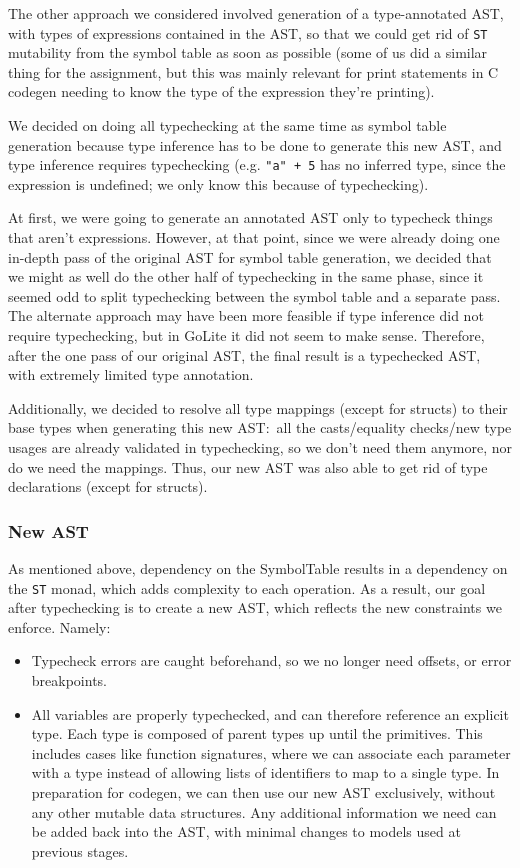 \documentclass[11pt]{article}
\begin{document}
The other approach we considered involved generation of a
type-annotated AST, with types of expressions contained in the AST, so
that we could get rid of \texttt{ST} mutability from the symbol table
as soon as possible (some of us did a similar thing for the
assignment, but this was mainly relevant for print statements in C
codegen needing to know the type of the expression they're printing).

We decided on doing all typechecking at the same time as symbol table
generation because type inference has to be done to generate this new
AST, and type inference requires typechecking (e.g. \texttt{"a" + 5}
has no inferred type, since the expression is undefined; we only know
this because of typechecking).

At first, we were going to generate an annotated AST only to typecheck
things that aren't expressions. However, at that point, since we were
already doing one in-depth pass of the original AST for symbol table
generation, we decided that we might as well do the other half of
typechecking in the same phase, since it seemed odd to split
typechecking between the symbol table and a separate pass. The
alternate approach may have been more feasible if type inference did
not require typechecking, but in GoLite it did not seem to make
sense. Therefore, after the one pass of our original AST, the final
result is a typechecked AST, with extremely limited type annotation.

Additionally, we decided to resolve all type mappings (except for
structs) to their base types when generating this new AST:~all the
casts/equality checks/new type usages are already validated in
typechecking, so we don't need them anymore, nor do we need the
mappings. Thus, our new AST was also able to get rid of type
declarations (except for structs).
\subsubsection{New AST}
As mentioned above, dependency on the SymbolTable results in a
dependency on the \texttt{ST} monad, which adds complexity to each
operation.  As a result, our goal after typechecking is to create a
new AST, which reflects the new constraints we enforce.  Namely:
\begin{itemize}
\item Typecheck errors are caught beforehand, so we no longer need
  offsets, or error breakpoints.
\item All variables are properly typechecked, and can therefore
  reference an explicit type. Each type is composed of parent types up
  until the primitives.  This includes cases like function signatures,
  where we can associate each parameter with a type instead of
  allowing lists of identifiers to map to a single type.  In
  preparation for codegen, we can then use our new AST exclusively,
  without any other mutable data structures. Any additional
  information we need can be added back into the AST, with minimal
  changes to models used at previous stages.
\end{itemize}
\end{document}
